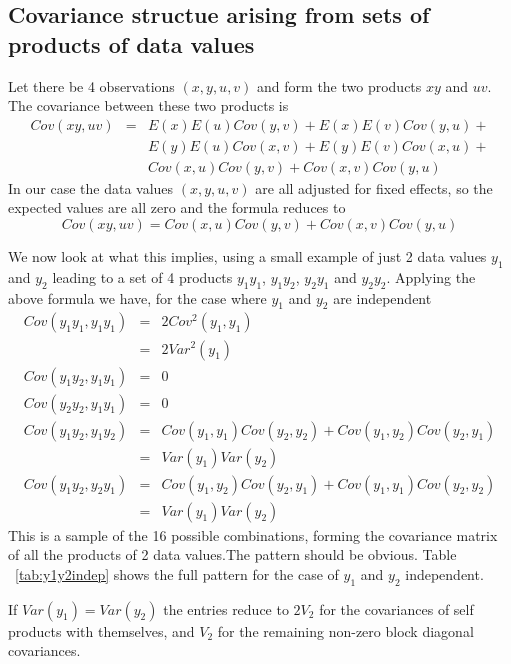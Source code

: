 \documentclass[titlepage,a4paper,12pt]{article}  %
\begin{document}
\subsection{Covariance structue arising from sets of products of data values}
 Let there be 4 observations $(x,y,u,v)$ and form the two products $xy$ and $uv$. The covariance between these two products is 
\begin{eqnarray}
Cov(xy,uv) & = & E(x)E(u)Cov(y,v) + E(x)E(v)Cov(y,u) + \\
           &   &  E(y)E(u)Cov(x,v) + E(y)E(v)Cov(x,u) + \\
           &   &  Cov(x,u)Cov(y,v) + Cov(x,v)Cov(y,u)
\end{eqnarray}
In our case the data values $(x,y,u,v)$ are all adjusted for fixed effects, so the expected values are all zero and the formula reduces to 
\begin{equation}
Cov(xy,uv) = Cov(x,u)Cov(y,v) + Cov(x,v)Cov(y,u)
\end{equation}

We now look at what this implies, using a small example of just 2 data values $y_{1}$ and $y_{2}$ leading to a set of 4 products $y_{1}y_{1}$, $y_{1}y_{2}$, $y_{2}y_{1}$ and $y_{2}y_{2}$. Applying the above formula we have, for the case where $y_{1}$ and $y_{2}$ are independent
\begin{eqnarray}
Cov(y_{1}y_{1},y_{1}y_{1}) & = & 2 Cov^{2}(y_{1},y_{1}) \\
                           & = & 2 Var^{2}(y_{1}) \\
Cov(y_{1}y_{2},y_{1}y_{1}) & = & 0 \\
Cov(y_{2}y_{2},y_{1}y_{1}) & = & 0 \\
Cov(y_{1}y_{2},y_{1}y_{2}) & = & Cov(y_{1},y_{1})Cov(y_{2},y_{2}) + Cov(y_{1},y_{2})Cov(y_{2},y_{1}) \\
                           & = & Var(y_{1}) Var(y_{2}) \\
Cov(y_{1}y_{2},y_{2}y_{1}) & = & Cov(y_{1},y_{2})Cov(y_{2},y_{1}) + Cov(y_{1},y_{1})Cov(y_{2},y_{2}) \\
                           & = & Var(y_{1}) Var(y_{2})
\end{eqnarray}
 This is a sample of the 16 possible combinations, forming the covariance matrix of all the products of 2 data values.The pattern should be obvious. Table ~\ref{tab:y1y2indep} shows the full pattern for the case of $y_{1}$ and $y_{2}$ independent.

If $Var(y_{1}) = Var(y_{2})$ the entries reduce to $2 V_{2}$ for the covariances of self products with themselves, and $V_{2}$ for the remaining non-zero block diagonal covariances.
\end{document}
